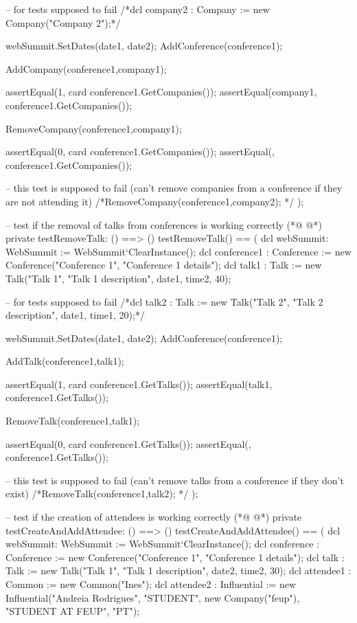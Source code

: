 \begin{vdmpp}[breaklines=true]
  -- for tests supposed to fail
  /*dcl company2 : Company := new Company("Company 2");*/
  
  webSummit.SetDates(date1, date2);
  AddConference(conference1);

  AddCompany(conference1,company1);
  
  assertEqual(1, card conference1.GetCompanies());
  assertEqual({company1}, conference1.GetCompanies());
  
  RemoveCompany(conference1,company1);
  
  assertEqual(0, card conference1.GetCompanies());
  assertEqual({}, conference1.GetCompanies());
  
  -- this test is supposed to fail (can't remove companies from a conference if they are not attending it)
  /*RemoveCompany(conference1,company2); */
 );
 
  -- test if the removal of talks from conferences is working correctly
(*@
\label{testRemoveTalk:309}
@*)
 private testRemoveTalk: () ==> ()
 testRemoveTalk() == (
  dcl webSummit: WebSummit := WebSummit`ClearInstance();
  dcl conference1 : Conference := new Conference("Conference 1", "Conference 1 details");
  dcl talk1 : Talk := new Talk("Talk 1", "Talk 1 description", date1, time2, 40);
  
  -- for tests supposed to fail
  /*dcl talk2 : Talk := new Talk("Talk 2", "Talk 2 description", date1, time1, 20);*/
  
  webSummit.SetDates(date1, date2);
  AddConference(conference1);
  
  AddTalk(conference1,talk1);
  
  assertEqual(1, card conference1.GetTalks());
  assertEqual({talk1}, conference1.GetTalks());
  
  RemoveTalk(conference1,talk1);
  
  assertEqual(0, card conference1.GetTalks());
  assertEqual({}, conference1.GetTalks());
  
  -- this test is supposed to fail (can't remove talks from a conference if they don't exist)
  /*RemoveTalk(conference1,talk2); */
 );
 
 -- test if the creation of attendees is working correctly
(*@
\label{testCreateAndAddAttendee:336}
@*)
 private testCreateAndAddAttendee: () ==> ()
 testCreateAndAddAttendee() == (
  dcl webSummit: WebSummit := WebSummit`ClearInstance();
  dcl conference : Conference := new Conference("Conference 1", "Conference 1 details");
  dcl talk : Talk := new Talk("Talk 1", "Talk 1 description", date2, time2, 30);
  dcl attendee1 : Common := new Common("Ines");
  dcl attendee2 : Influential := new Influential("Andreia Rodrigues", "STUDENT", new Company("feup"), "STUDENT AT FEUP", "PT");
 

\end{vdmpp}
